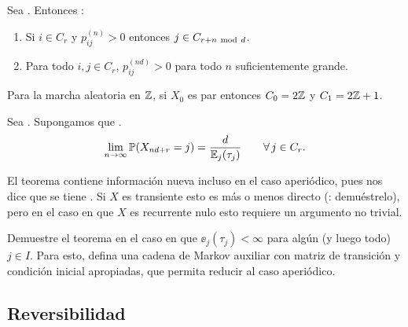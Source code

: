 \begin{prop}
Sea .
Entonces :
\begin{enumerate}[label=\uptext{(\arabic*)}]
\item Si $i\in C_r$ y $p^{(n)}_{ij}>0$ entonces $j\in C_{r+n~\text{\upshape{mod}}~d}$.
\item Para todo $i,j\in C_r$, $p^{(nd)}_{ij}>0$ para todo $n$ suficientemente grande.
\end{enumerate}
\end{prop}

\begin{ex}
Para la marcha aleatoria en $\mathbb{Z}$, si $X_0$ es par entonces $C_0=2\mathbb{Z}$ y $C_1=2\mathbb{Z}+1$.
\end{ex}

\begin{thm}\label{thm:eq-gen}
Sea .
Supongamos que .
\[\lim_{n\to\infty}\mathbb{P}(X_{nd+r}=j)=\frac{d}{\mathbb{E}_j(\tau_j)}\qquad\forall\,j\in C_r.\]
\end{thm}

\begin{rem}
El teorema contiene información nueva incluso en el caso aperiódico, pues nos dice que  se tiene .
Si $X$ es transiente esto es más o menos directo (\uexers: demuéstrelo), pero en el caso en que $X$ es recurrente nulo esto requiere un argumento no trivial.
\end{rem}

\begin{exer}
Demuestre el teorema en el caso en que $\ee_j(\tau_j)<\infty$ para algún (y luego todo) $j\in I$.
Para esto, defina una cadena de Markov auxiliar con matriz de transición y condición inicial apropiadas, que permita reducir al caso aperiódico.
\end{exer}

\subsection{Reversibilidad}

